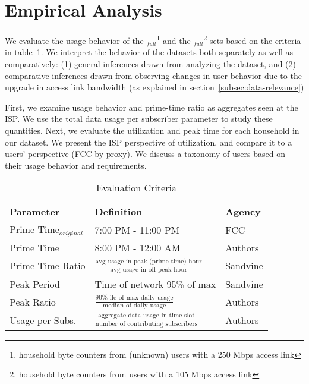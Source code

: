 \section{Empirical Analysis}\label{sec:analysis}


We evaluate the usage behavior of the \test$_{full}$\footnote{household byte counters
from (unknown) users with a 250 Mbps access link}  and the \control$_{full}$\footnote{household
byte counters from users with a 105 Mbps access link} sets based
on the criteria in table~\ref{tab:eval-criteria}. We interpret the behavior of the datasets
both separately as well as comparatively: (1) general inferences drawn from analyzing the dataset,
and (2) comparative inferences drawn from observing changes in user behavior due to the upgrade
in access link bandwidth (as explained in section~\ref{subsec:data-relevance})

First, we examine usage behavior and prime-time ratio as aggregates seen at the ISP. We use 
the total data usage per subscriber parameter to study these quantities. Next, we
evaluate the utilization and peak time for each household in our dataset. We present the ISP
perspective of utilization, and compare it to a users' perspective (FCC by proxy). We discuss
a taxonomy of users based on their usage behavior and requirements. %

\begin{table}[ht]
\small 
\begin{tabular}{|l|l|l|}
\hline
\textbf{Parameter}				& \textbf{Definition}				& \textbf{Agency}  \\ \hline
Prime Time$_{original}$			& 7:00 PM - 11:00 PM				& FCC       \\
Prime Time       				& 8:00 PM - 12:00 AM                & Authors       \\
Prime Time Ratio 				& \( \frac{ \text{avg usage in peak (prime-time) hour}}{ \text{avg usage in off-peak hour}}\) 												& Sandvine  \\
Peak Period						& Time of network 95\% of max      	& Sandvine \\
Peak Ratio       				& \(\frac{\text{90\%-ile of max daily usage}}{\text{median of daily usage}}\)                											& Authors \\
Usage per Subs.       			& \(\frac{\text{aggregate data usage in time slot}}{\text{number of contributing subscribers}}\)                											& Authors \\ \hline
\end{tabular}
\caption{Evaluation Criteria}
\label{tab:eval-criteria}
\end{table}












